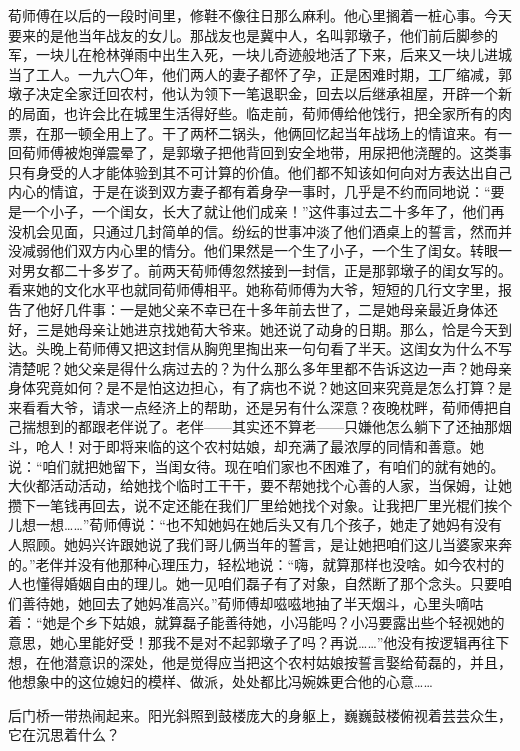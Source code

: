 \par 荀师傅在以后的一段时间里，修鞋不像往日那么麻利。他心里搁着一桩心事。今天要来的是他当年战友的女儿。那战友也是冀中人，名叫郭墩子，他们前后脚参的军，一块儿在枪林弹雨中出生入死，一块儿奇迹般地活了下来，后来又一块儿进城当了工人。一九六〇年，他们两人的妻子都怀了孕，正是困难时期，工厂缩减，郭墩子决定全家迁回农村，他认为领下一笔退职金，回去以后继承祖屋，开辟一个新的局面，也许会比在城里生活得好些。临走前，荀师傅给他饯行，把全家所有的肉票，在那一顿全用上了。干了两杯二锅头，他俩回忆起当年战场上的情谊来。有一回荀师傅被炮弹震晕了，是郭墩子把他背回到安全地带，用尿把他浇醒的。这类事只有身受的人才能体验到其不可计算的价值。他们都不知该如何向对方表达出自己内心的情谊，于是在谈到双方妻子都有着身孕一事时，几乎是不约而同地说：“要是一个小子，一个闺女，长大了就让他们成亲！”这件事过去二十多年了，他们再没机会见面，只通过几封简单的信。纷纭的世事冲淡了他们酒桌上的誓言，然而并没减弱他们双方内心里的情分。他们果然是一个生了小子，一个生了闺女。转眼一对男女都二十多岁了。前两天荀师傅忽然接到一封信，正是那郭墩子的闺女写的。看来她的文化水平也就同荀师傅相平。她称荀师傅为大爷，短短的几行文字里，报告了他好几件事：一是她父亲不幸已在十多年前去世了，二是她母亲最近身体还好，三是她母亲让她进京找她荀大爷来。她还说了动身的日期。那么，恰是今天到达。头晚上荀师傅又把这封信从胸兜里掏出来一句句看了半天。这闺女为什么不写清楚呢？她父亲是得什么病过去的？为什么那么多年里都不告诉这边一声？她母亲身体究竟如何？是不是怕这边担心，有了病也不说？她这回来究竟是怎么打算？是来看看大爷，请求一点经济上的帮助，还是另有什么深意？夜晚枕畔，荀师傅把自己揣想到的都跟老伴说了。老伴——其实还不算老——只嫌他怎么躺下了还抽那烟斗，呛人！对于即将来临的这个农村姑娘，却充满了最浓厚的同情和善意。她说：“咱们就把她留下，当闺女待。现在咱们家也不困难了，有咱们的就有她的。大伙都活动活动，给她找个临时工干干，要不帮她找个心善的人家，当保姆，让她攒下一笔钱再回去，说不定还能在我们厂里给她找个对象。让我把厂里光棍们挨个儿想一想……”荀师傅说：“也不知她妈在她后头又有几个孩子，她走了她妈有没有人照顾。她妈兴许跟她说了我们哥儿俩当年的誓言，是让她把咱们这儿当婆家来奔的。”老伴并没有他那种心理压力，轻松地说：“嗨，就算那样也没啥。如今农村的人也懂得婚姻自由的理儿。她一见咱们磊子有了对象，自然断了那个念头。只要咱们善待她，她回去了她妈准高兴。”荀师傅却嗞嗞地抽了半天烟斗，心里头嘀咕着：“她是个乡下姑娘，就算磊子能善待她，小冯能吗？小冯要露出些个轻视她的意思，她心里能好受！那我不是对不起郭墩子了吗？再说……”他没有按逻辑再往下想，在他潜意识的深处，他是觉得应当把这个农村姑娘按誓言娶给荀磊的，并且，他想象中的这位媳妇的模样、做派，处处都比冯婉姝更合他的心意……
\par 后门桥一带热闹起来。阳光斜照到鼓楼庞大的身躯上，巍巍鼓楼俯视着芸芸众生，它在沉思着什么？





